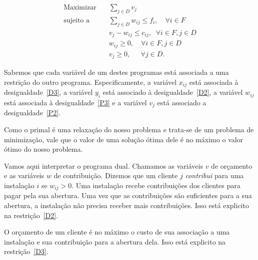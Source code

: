     \begin{align}
        \text{Maximizar} \quad & \sum_{j \in D} v_{j} \tag{D1} \label{D1}\\
        \text{sujeito a} \quad & \sum_{j\in D} w_{ij}\leq f_i, \quad \forall i \in F \tag{D2} \label{D2}\\
        &v_{j} - w_{ij}\leq c_{ij},  \; \; \forall i\in F,j\in D \tag{D3} \label{D3}\\
        &w_{ij} \geq 0 ,\quad \forall i\in F,j\in D\tag{D4} \label{D4}\\
        &v_j \geq 0, \quad \; \,\forall j\in D \tag{D5} \label{D5}.
       \end{align}

Sabemos que cada variável de um destes programas está associada a uma restrição do outro programa. 
Especificamente, a variável $x_{ij}$ está associada à desigualdade~\eqref{D3}, a variável $y_i$ está associado à desigualdade~\eqref{D2}, a variável $w_{ij}$ está associada à desigualdade~\eqref{P3} e a variável $v_j$ está associado a desigualdade~\eqref{P2}.

Como o primal é uma relaxação do nosso problema e trata-se de um problema de minimização, vale que o valor de uma solução ótima dele é no máximo o valor ótimo do nosso problema.

Vamos aqui interpretar o programa dual. Chamamos as variáveis $v$ de orçamento e as variáveis $w$ de contribuição. Dizemos que um cliente $j$ \emph{contribui} para uma instalação $i$ se $w_{ij} > 0$. Uma instalação recebe contribuições dos clientes para pagar pela sua abertura. Uma vez que as contribuições são suficientes para a sua abertura, a instalação não precisa receber mais contribuições. Isso está explicito na restrição~\eqref{D2}.

O orçamento de um cliente é no máximo o custo de sua associação a uma instalação e sua contribuição para a abertura dela. Isso está explicito na restrição~\eqref{D3}.

